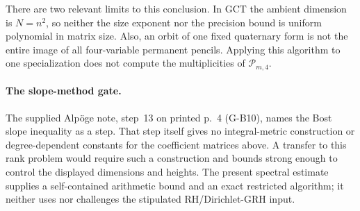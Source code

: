 There are two relevant limits to this conclusion. In GCT the ambient
dimension is $N=n^2$, so neither the size exponent nor the precision
bound is uniform polynomial in matrix size. Also, an orbit of one
fixed quaternary form is not the entire image of all four-variable
permanent pencils. Applying this algorithm to one specialization
does not compute the multiplicities of $\mathcal P_{m,4}$.

\paragraph{The slope-method gate.}
The supplied Alp\"oge note, step~13 on printed p.~4 (G-B10), names
the Bost slope inequality as a step. That step itself gives no integral-metric construction or
degree-dependent constants for the coefficient matrices above. A transfer to this rank problem would require such
a construction and bounds strong enough to control the displayed
dimensions and heights. The present spectral estimate supplies a
self-contained arithmetic bound and an exact restricted algorithm;
it neither uses nor challenges the stipulated RH/Dirichlet-GRH input.

